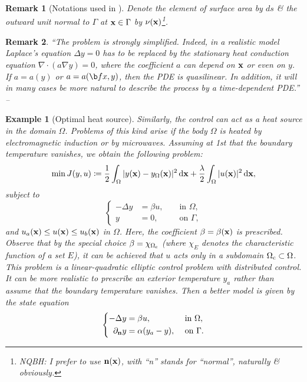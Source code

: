\documentclass[oneside]{book}
\numberwithin{equation}{section}
\newtheorem{example}{Example}[chapter]
\newtheorem{remark}{Remark}[chapter]
\begin{document}
\begin{remark}[Notations used in \cite{Troltzsch2010}]
	Denote the element of surface area by $ds$ \& the outward unit normal to $\Gamma$ at ${\bf x}\in\Gamma$ by $\nu({\bf x})$\footnote{NQBH: I prefer to use ${\bf n}({\bf x})$, with ``n'' stands for ``normal'', naturally \& obviously.}.
\end{remark}

\begin{remark}
	``The problem is strongly simplified. Indeed, in a realistic model Laplace's equation $\Delta y = 0$ has to be replaced by the stationary heat conduction equation $\nabla\cdot(a\nabla y) = 0$, where the coefficient $a$ can depend on ${\bf x}$ or even on $y$. If $a = a(y)$ or $a = a({\b f x},y)$, then the PDE is quasilinear. In addition, it will in many cases be more natural to describe the process by a time-dependent PDE.'' -- \cite[p. 4]{Troltzsch2010}
\end{remark}

\begin{example}[Optimal heat source]
	Similarly, the control can act as a \emph{heat source in the domain} $\Omega$. Problems of this kind arise if the body $\Omega$ is heated by electromagnetic induction or by microwaves. Assuming at 1st that the boundary temperature vanishes, we obtain the following problem:
	\begin{align*}
		\min J(y,u)\coloneqq\frac{1}{2}\int_\Omega |y({\bf x}) - y_\Omega({\bf x})|^2\,{\rm d}{\bf x} + \frac{\lambda}{2}\int_\Omega |u({\bf x})|^2\,{\rm d}{\bf x},
	\end{align*}
	subject to
	\begin{equation*}
		\left\{\begin{split}
			-\Delta y &= \beta u,&&\mbox{ in }\Omega,\\
			y &= 0,&&\mbox{ on }\Gamma,
		\end{split}\right.
	\end{equation*}
	and $u_a({\bf x})\le u({\bf x})\le u_b({\bf x})$ in $\Omega$. Here, the coefficient $\beta = \beta({\bf x})$ is prescribed. Observe that by the special choice $\beta = \chi_{\Omega_{\rm c}}$ (where $\chi_E$ denotes the characteristic function of a set $E$), it can be achieved that $u$ acts only in a subdomain $\Omega_{\rm c}\subset\Omega$. This problem is a \emph{linear-quadratic elliptic control problem with distributed control}. It can be more realistic to prescribe an exterior temperature $y_a$ rather than assume that the boundary temperature vanishes. Then a better model is given by the state equation
	\begin{equation*}
		\left\{\begin{split}
			-\Delta y &= \beta u,&&\mbox{ in }\Omega,\\
			\partial_{\bf n}y &= \alpha(y_a - y),&&\mbox{ on }\Gamma.
		\end{split}\right.
	\end{equation*}
\end{example}
\end{document}
